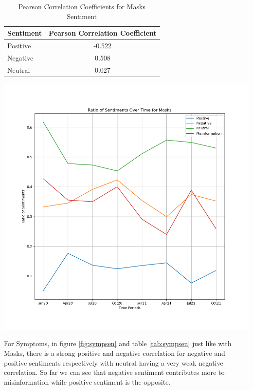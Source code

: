 \documentclass{l4proj}
\begin{document}
\begin{table}[h]
\begin{minipage}[c]{0.30\linewidth}
\centering
\begin{tabular}{@{}ll@{}}
\toprule
Sentiment & Pearson Correlation Coefficient \\ \midrule
Positive  & \multicolumn{1}{c}{-0.522}      \\
Negative  & \multicolumn{1}{c}{0.508}       \\
Neutral   & \multicolumn{1}{c}{0.027}       \\ \bottomrule
\end{tabular}
\caption{Pearson Correlation Coefficients for Masks Sentiment}
\label{tab:masksen}
\end{minipage}\hfill
\begin{minipage}[c]{0.55\linewidth}
\centering
\includegraphics[width=\textwidth]{images/MasksSentiment.png}
\label{fig:masksen}
\end{minipage}
\end{table}

For Symptoms, in figure \ref{fig:sympsen} and table \ref{tab:sympsen} just like with Masks, there is a strong positive and negative correlation for negative and positive sentiments respectively with neutral having a very weak negative correlation. So far we can see that negative sentiment contributes more to misinformation while positive sentiment is the opposite.
\end{document}
